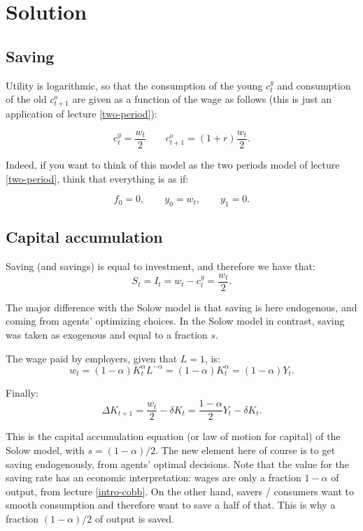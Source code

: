 \documentclass[]{book}
\theoremstyle{definition}
\theoremstyle{definition}
\theoremstyle{definition}
\theoremstyle{remark}
\begin{document}
\section{Solution}\label{solution}

\subsection{Saving}\label{saving}

Utility is logarithmic, so that the consumption of the young
\(c_{t}^{y}\) and consumption of the old \(c_{t+1}^{o}\) are given as a
function of the wage as follows (this is just an application of lecture
\ref{two-period}):

\[c_{t}^{y}=\frac{w_{t}}{2}\qquad c_{t+1}^{o}=(1+r)\frac{w_{t}}{2}.\]

Indeed, if you want to think of this model as the two periods model of
lecture \ref{two-period}, think that everything is as if:

\[f_{0}=0,\qquad y_{0}=w_{t},\qquad y_{1}=0.\]

\subsection{Capital accumulation}\label{capital-accumulation}

Saving (and savings) is equal to investment, and therefore we have that:
\[S_t = I_t = w_{t}-c_{t}^{y}=\frac{w_{t}}{2}.\]

The major difference with the Solow model is that saving is here
endogenous, and coming from agents' optimizing choices. In the Solow
model in contrast, saving was taken as exogenous and equal to a fraction
\(s\).

The wage paid by employers, given that \(L=1\), is:
\[w_{t}=(1-\alpha)K_{t}^{\alpha}L^{-\alpha}=(1-\alpha)K_{t}^{\alpha} = (1-\alpha)Y_t.\]

Finally:
\[\Delta K_{t+1}=\frac{w_{t}}{2}-\delta K_{t} = \frac{1-\alpha}{2}Y_t-\delta K_t.\]

This is the capital accumulation equation (or law of motion for capital)
of the Solow model, with \(s = (1-\alpha)/2\). The new element here of
course is to get saving endogenously, from agents' optimal decisions.
Note that the value for the saving rate has an economic interpretation:
wages are only a fraction \(1-\alpha\) of output, from lecture
\ref{intro-cobb}. On the other hand, savers / consumers want to smooth
consumption and therefore want to save a half of that. This is why a
fraction \((1-\alpha)/2\) of output is saved.
\end{document}
